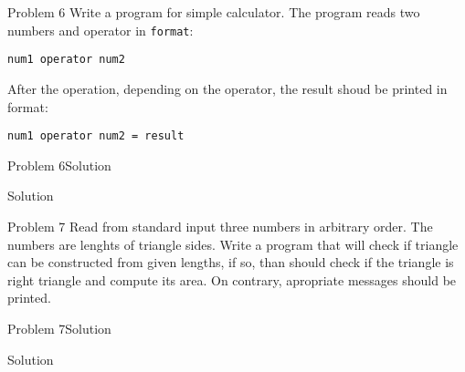 \begin{frame}[fragile]{Problem 6}
Write a program for simple calculator. The program reads two numbers and
operator in \texttt{format}:
\begin{center}
\texttt{num1 operator num2}
\end{center}
After the operation, depending on the operator, the result shoud be printed in
format:
\begin{center}
\texttt{num1 operator num2 = result}
\end{center}
\end{frame}

\begin{frame}[fragile]{Problem 6}{Solution}
	\begin{exampleblock}{Solution}
	
	\end{exampleblock}
\end{frame}


\begin{frame}[fragile]{Problem 7}
Read from standard input three numbers in arbitrary order. The numbers 
are lenghts of triangle sides. Write a program that will check if triangle can
be constructed from given lengths, if so, than should check if the triangle is
right triangle and compute its area. On contrary, apropriate messages should be
printed.
\end{frame}


\begin{frame}[fragile]{Problem 7}{Solution}
	\begin{exampleblock}{Solution}
	
	\end{exampleblock}
\end{frame}

